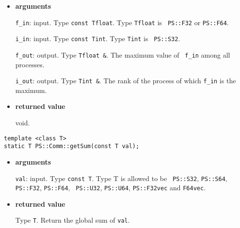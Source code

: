 \begin{itemize}

\item{\bf arguments}

{\tt f\_in}: input. Type {\tt const Tfloat}. Type {\tt Tfloat} is {\tt
PS::F32} or {\tt PS::F64}.

{\tt i\_in}: input. Type {\tt const Tint}. Type {\tt Tint} is {\tt
PS::S32}.

{\tt f\_out}: output. Type {\tt Tfloat \&}. The maximum value of {\tt
f\_in} among all processes.

{\tt i\_out}: output. Type {\tt Tint \&}. The rank of the process of
which {\tt f\_in} is the maximum.






\item{\bf returned value}

void.

\end{itemize}


\begin{screen}
\begin{verbatim}
template <class T>
static T PS::Comm::getSum(const T val);
\end{verbatim}
\end{screen}

\begin{itemize}

\item{\bf arguments}

{\tt val}: input. Type {\tt const T}. Type T is allowed to be {\tt
     PS::S32}, {\tt PS::S64}, {\tt PS::F32}, {\tt PS::F64}, {\tt
     PS::U32}, {\tt PS::U64}, {\tt PS::F32vec} and {\tt F64vec}.
     

\item{\bf returned value}

Type {\tt T}. Return the global sum of {\tt val}.


\end{itemize}

